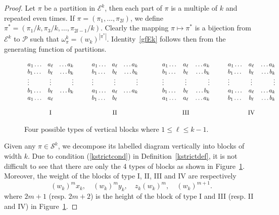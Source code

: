 \documentclass[12pt]{amsart}
\numberwithin{equation}{section}
\theoremstyle{plain}
\theoremstyle{definition}
\begin{document}
\begin{proof}
Let  $\pi$ be  a  partition in  $\mathcal{E}^k$, then 
 each part of $\pi$ is a multiple of $k$ and repeated even times. 
 If $\pi=(\pi_1, \ldots, \pi_{2l})$,  we define $\pi^*=(\pi_1/k, \pi_3/k,\ldots, \pi_{2l-1}/k)$.
 Clearly the mapping $\pi\mapsto \pi^*$ is a bijection from $\mathcal{E}^k$ to $\mathcal{P}$ such that $\omega^k_\pi=(w_k)^{|\pi^*|}$. Identity~\eqref{gfEk} follows then from  the generating function of partitions.
 
 

\begin{figure}
$$

\begin{array}{lcrc lcrc lcrc lcr}
a_1\ldots &a_\ell&  \ldots a_k & \quad & a_1\ldots &a_\ell & \ldots a_k& \quad &
a_1\ldots& a_\ell& \ldots a_k&\quad& a_1\ldots &a_\ell&  \ldots a_k \\
b_1\ldots & b_\ell&   \ldots b_k & \quad & b_1\ldots& b_\ell  & \ldots b_k& \quad &
b_1\ldots & b_\ell&   \ldots b_k&\quad &b_1\ldots&  b_\ell&   \ldots b_k\\
\vdots &  \vdots&   \vdots & \quad & \vdots&  \vdots&  \vdots & \quad &\vdots&  \vdots& \vdots &\quad&\vdots &  \vdots&   \vdots \\
b_1\ldots &b_\ell&   \ldots b_k & \quad &a_1\ldots& a_\ell&   \ldots a_k & \quad & 
b_1\ldots& b_\ell&   \ldots b_k&\quad & a_1\ldots& a_\ell&   \ldots a_k \\
a_1 \ldots&  a_\ell&   &   \quad & b_1  \ldots& b_\ell &   & \qquad & 
a_1\ldots& a_\ell&  \ldots a_k &\quad& b_1\ldots&  b_\ell&   \ldots b_k  \\
 &&&&&&\\
  &\text{I} &    & \quad &  &\text{II} &   & \quad &   &\text{III}&  &\quad &&\text{IV} &
\end{array}
$$
\caption{Four possible types of vertical blocks where $1\leq \ell\leq k-1$.}
\label{sixtypes}
\end{figure}

 Given any $\pi\in\mathcal{S}^k$, we decompose its labelled  diagram vertically into blocks of width $k$. 
 Due to condition (\ref{kstrictcond}) in Definition~\ref{kstrictdef}, it is not difficult to see  that there are only
the 4 types of blocks  as shown in Figure~\ref{sixtypes}. Moreover, the weight of the blocks of type
 I, II,  III and IV are respectively 
$$
(w_k)^{m} x_k,\quad  (w_k)^{m} y_k,
\quad z_k(w_k)^{m}, \quad (w_k)^{m+1}.
$$ 
where $2m+1$ (resp. $2m+2$) is the height of  the block of type I and III (resp. II and IV) in Figure~\ref{sixtypes}.


\end{proof}
\end{document}
